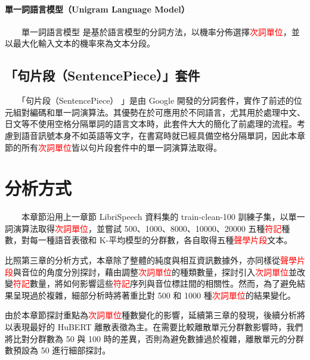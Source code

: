 \paragraph{單一詞語言模型（Unigram Language Model）} \hfill \break
%
　　單一詞語言模型 \cite{kudo2018subword} 是基於語言模型的分詞方法，以機率分佈選擇\textcolor{red}{次詞單位}，並以最大化輸入文本的機率來為文本分段。

\subsection{「句片段（SentencePiece）」套件}

　　「句片段（SentencePiece） \cite{kudo_sentencepiece_2018}」是由 Google 開發的分詞套件，實作了前述的位元組對編碼和單一詞演算法。其優勢在於可應用於不同語言，尤其用於處理中文、日文等不使用空格分隔單詞的語言文本時，此套件大大的簡化了前處理的流程。考慮到語音訊號本身不如英語等文字，在書寫時就已經具備空格分隔單詞，因此本章節的所有\textcolor{red}{次詞單位}皆以句片段套件中的單一詞演算法取得。

\section{分析方式}

　　本章節沿用上一章節 LibriSpeech 資料集的 train-clean-100 訓練子集，以單一詞演算法取得\textcolor{red}{次詞單位}，並嘗試 500、1000、8000、10000、20000 五種\textcolor{red}{符記}種數，對每一種語音表徵和 K-平均模型的分群數，各自取得五種\textcolor{red}{聲學片段}文本。

        比照第三章的分析方式，本章除了整體的純度與相互資訊數據外，亦同樣從\textcolor{red}{聲學片段}與音位的角度分別探討，藉由調整\textcolor{red}{次詞單位}的種類數量，探討引入\textcolor{red}{次詞單位}並改變\textcolor{red}{符記}數量，將如何影響這些\textcolor{red}{符記}序列與音位標註間的相關性。然而，為了避免結果呈現過於複雜，細部分析時將著重比對 500 和 1000 種\textcolor{red}{次詞單位}的結果變化。

        由於本章節探討重點為\textcolor{red}{次詞單位}種數變化的影響，延續第三章的發現，後續分析將以表現最好的 HuBERT 離散表徵為主。在需要比較離散單元分群數影響時，我們將比對分群數為 50 與 100 時的差異，否則為避免數據過於複雜，離散單元的分群數預設為 50 進行細部探討。

